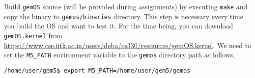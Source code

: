 \documentclass{article}
\begin{document}
Build \texttt{gemOS} source (will be provided during assignments) by 
executing \texttt{make} and copy the binary to \texttt{gemos/binaries} directory.
This step is necessary every time you build the OS and want to test it.
%
For the time being, you can download \texttt{gemOS.kernel} from \url{https://www.cse.iitk.ac.in/users/deba/cs330/resources/gemOS.kernel}.
%
We need to set the \texttt{M5\_PATH} environment variable to the \texttt{gemos} directory path as follows,


\vspace{0.25cm}
\noindent
\texttt{/home/user/gem5\$ export M5\_PATH=/home/user/gem5/gemos}
%
% 
% 
 
\end{document}
